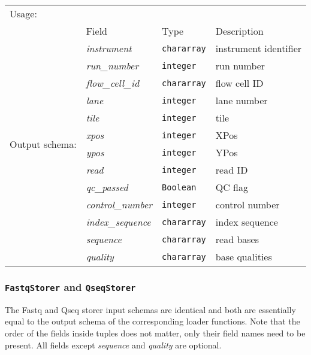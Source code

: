 \begin{tabular}{lp{}p{}p{}}
Usage: & \multicolumn{3}{l}{}
\hspace*{-0.55cm}\begin{minipage}{0.8\textwidth}
  \begin{lstlisting}
  reads = load 'input.fq' using FastqLoader();
  \end{lstlisting}
  \end{minipage}\hfill\kern-\arrayrulewidth
 \\[0.25cm]
\multirow{14}{*}{Output schema:} & Field & Type & Description\\[0.1cm]
& \emph{instrument} & \texttt{chararray} & instrument identifier\\
& \emph{run\_number} & \texttt{integer} & run number\\
& \emph{flow\_cell\_id} & \texttt{chararray} & flow cell ID\\
& \emph{lane} & \texttt{integer} & lane number\\
& \emph{tile} & \texttt{integer} & tile\\
& \emph{xpos} & \texttt{integer} & XPos\\
& \emph{ypos} & \texttt{integer} & YPos\\
& \emph{read} & \texttt{integer} & read ID\\
& \emph{qc\_passed} & \texttt{Boolean} & QC flag\\
& \emph{control\_number} & \texttt{integer} & control number\\
& \emph{index\_sequence} & \texttt{chararray} & index sequence\\
& \emph{sequence} & \texttt{chararray} & read bases\\
& \emph{quality} & \texttt{chararray} & base qualities
\end{tabular}

\subsubsection{\texttt{FastqStorer} and \texttt{QseqStorer}}

The Fastq and Qseq storer input schemas are identical and both are
essentially equal to the output schema of the corresponding loader
functions. Note that the order of the fields inside tuples does not
matter, only their field names need to be present. All fields except
\emph{sequence} and \emph{quality} are optional.

